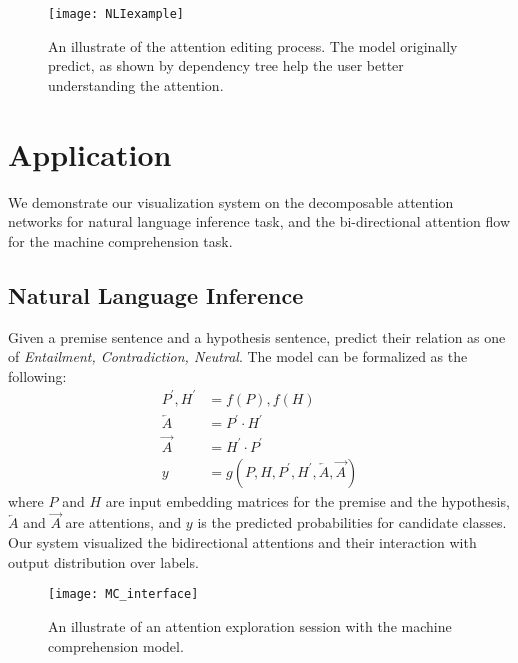 
\begin{figure*}[t]
\centering
\vspace{-2mm}
 \texttt{[image: NLIexample]}
  \vspace{-6mm}
 \caption{
An illustrate of the attention editing process. 
The model originally predict, as shown by dependency tree help the user better understanding the attention. 
}
\label{fig:NLIexample}
\end{figure*}

\section{Application}
We demonstrate our visualization system on the decomposable attention networks
for natural language inference task, and the bi-directional attention flow for the machine comprehension task.

\subsection{Natural Language Inference}
Given a premise sentence and a hypothesis sentence,
predict their relation as one of \emph{Entailment, Contradiction, Neutral}.
The model can be formalized as the following:
\begin{align}
	P^\prime, H^\prime &= f(P), f(H)\\
	\overleftarrow{A} &= P^\prime \cdot H^\prime\\
	\overrightarrow{A} &= H^\prime \cdot P^\prime\\
	y &= g(P, H, P^\prime, H^\prime, \overleftarrow{A}, \overrightarrow{A})
\end{align}
where $P$ and $H$ are input embedding matrices for the premise and the hypothesis, $\overleftarrow{A}$
and $\overrightarrow{A}$ are attentions, and $y$ is the predicted probabilities for candidate classes.
Our system visualized the bidirectional attentions and their interaction with output distribution over labels.

\begin{figure*}[t]
\centering
\vspace{-2mm}
 \texttt{[image: MC\_interface]}
  \vspace{-6mm}
 \caption{
An illustrate of an attention exploration session with the machine comprehension model.
}
\label{fig:MCexample}
\end{figure*}

